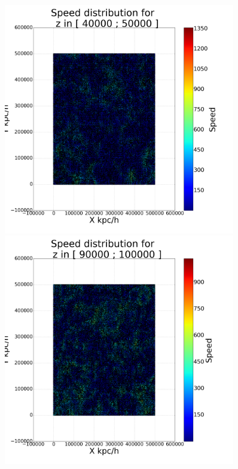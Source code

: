 \documentclass[12pt]{article}
\begin{document}
\begin{figure}[ht]
\centering
\begin{minipage}{.45\textwidth}
  \centering
  \includegraphics[width=0.9\textwidth]{graphs/scatter_magnitud_vel50000.png}
\end{minipage}%
\begin{minipage}{.45\textwidth}
  \centering
  \includegraphics[width=0.9\textwidth]{graphs/scatter_magnitud_vel100000.png}

\end{minipage}
\end{figure}
\end{document}
